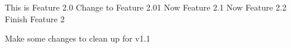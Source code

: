 This is Feature 2.0
Change to Feature 2.01
Now Feature 2.1
Now Feature 2.2
Finish Feature 2

Make some changes to clean up for v1.1
